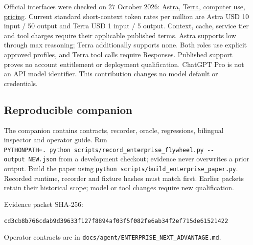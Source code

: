 \documentclass[
  10pt,
]{article}
\begin{document}
Official interfaces were checked on 27 October 2026:
\href{https://developers.openai.com/api/docs/models/gpt-6-astra}{Astra},
\href{https://developers.openai.com/api/docs/models/gpt-6.1-terra}{Terra},
\href{https://developers.openai.com/api/docs/guides/tools-computer-use}{computer
use}, \href{https://developers.openai.com/api/docs/pricing}{pricing}.
Current standard short-context token rates per million are Astra USD 10
input / 50 output and Terra USD 1 input / 5 output. Context, cache,
service tier and tool charges require their applicable published terms.
Astra supports low through max reasoning; Terra additionally supports
none. Both roles use explicit approved profiles, and Terra tool calls
require Responses. Published support proves no account entitlement or
deployment qualification. ChatGPT Pro is not an API model identifier.
This contribution changes no model default or credentials.

\hypertarget{reproducible-companion}{%
\subsection{Reproducible companion}\label{reproducible-companion}}

The companion contains contracts, recorder, oracle, regressions,
bilingual inspector and operator guide. Run
\texttt{PYTHONPATH=.\ python\ scripts/record\_enterprise\_flywheel.py\ -\/-output\ NEW.json}
from a development checkout; evidence never overwrites a prior output.
Build the paper using
\texttt{python\ scripts/build\_enterprise\_paper.py}. Recorded runtime,
recorder and fixture hashes must match first. Earlier packets retain
their historical scope; model or tool changes require new qualification.

Evidence packet SHA-256:

\texttt{cd3cb8b766cdab9d39633f127f8894af03f5f082fe6ab34f2ef715de61521422}

Operator contracts are in
\texttt{docs/agent/ENTERPRISE\_NEXT\_ADVANTAGE.md}.
\end{document}

